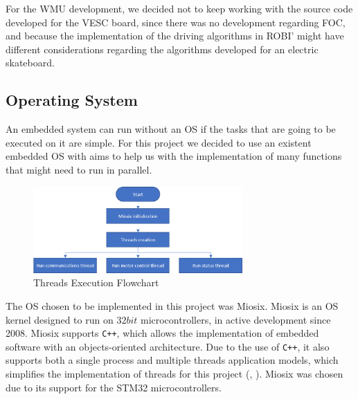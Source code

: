 For the \ac{WMU} development, we decided not to keep working with the source code developed for the VESC board, since there was no development regarding \ac{FOC}, and because the implementation of the driving algorithms in ROBI' might have different considerations regarding the algorithms developed for an electric skateboard.

\subsection{Operating System}

An embedded system can run without an \acf{OS} if the tasks that are going to be executed on it are simple. For this project we decided to use an existent embedded \ac{OS} with aims to help us with the implementation of many functions that might need to run in parallel.

\begin{figure}[htbp]
\centering
\includegraphics[width=8cm]{Images/flowcharts/threads_flow.png} 
\caption[Threads Execution Flowchart]{Threads Execution Flowchart}
\label{fig:threads_flow}
\end{figure}

The \ac{OS} chosen to be implemented in this project was Miosix. Miosix is an OS kernel designed to run on $32bit$ microcontrollers, in active development since 2008. Miosix supports \texttt{C++}, which allows the implementation of embedded software with an objects-oriented architecture. Due to the use of \texttt{C++}, it also supports both a single process and multiple threads application models, which simplifies the implementation of threads for this project (\citeauthor{miosix}, \citeyear{miosix}). Miosix was chosen due to its support for the STM32 microcontrollers.

